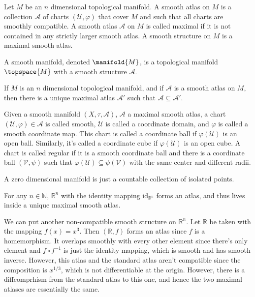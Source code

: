         \begin{definition}
            Let $M$ be an $n$ dimensional topological manifold. A smooth atlas
            on $M$ is a collection $\mathcal{A}$ of charts
            $(\mathcal{U},\varphi)$ that cover $M$ and such that all charts
            are smoothly compatible. A smooth atlas $\mathcal{A}$ on $M$ is
            called maximal if it is not contained in any strictly larger
            smooth atlas. A smooth structure on $M$ is a maximal smooth atlas.
        \end{definition}
        \begin{definition}
            A smooth manifold, denoted $\manifold{M}$, is a topological manifold
            $\topspace{M}$ with a smooth structure $\mathcal{A}$.
        \end{definition}
        \begin{theorem}
            If $M$ is an $n$ dimensional topological manifold, and if
            $\mathcal{A}$ is a smooth atlas on $M$, then there is a unique
            maximal atlas $\mathcal{A}'$ such that
            $\mathcal{A}\subseteq\mathcal{A}'$.
        \end{theorem}
        Given a smooth manifold $(X,\tau,\mathcal{A})$, $\mathcal{A}$ a maximal
        smooth atlas, a chart $(\mathcal{U},\varphi)\in\mathcal{A}$ is called
        smooth, $\mathcal{U}$ is called a coordinate domain, and $\varphi$ is
        called a smooth coordinate map. This chart is called a coordinate ball
        if $\varphi(\mathcal{U})$ is an open ball. Similarly, it's called a
        coordinate cube if $\varphi(\mathcal{U})$ is an open cube. A chart is
        called regular if it is a smooth coordinate ball and there is a
        coordinate ball $(\mathcal{V},\psi)$ such that
        $\varphi(\mathcal{U})\subseteq\psi(\mathcal{V})$ with the same center
        and different radii.
        \begin{example}
            A zero dimensional manifold is just a countable collection of
            isolated points.
        \end{example}
        \begin{example}
            For any $n\in\mathbb{N}$, $\mathbb{R}^{n}$ with the identity mapping
            $\textrm{id}_{\mathbb{R}^{n}}$ forms an atlas, and thus lives inside
            a unique maximal smooth atlas.
        \end{example}
        \begin{example}
            We can put another non-compatible smooth structure on
            $\mathbb{R}^{n}$. Let $\mathbb{R}$ be taken with the mapping
            $f(x)=x^{3}$. Then $(\mathbb{R},f)$ forms an atlas since $f$ is a
            homemorphism. It overlaps smoothly with every other element since
            there's only element and $f\circ{f}^{\minus{1}}$ is just the
            identity mapping, which is smooth and has smooth inverse. However,
            this atlas and the standard atlas aren't compatible since the
            composition is $x^{1/3}$, which is not differentiable at the origin.
            However, there is a diffeomprhism from the standard atlas to this
            one, and hence the two maximal atlases are essentially the same.
        \end{example}
